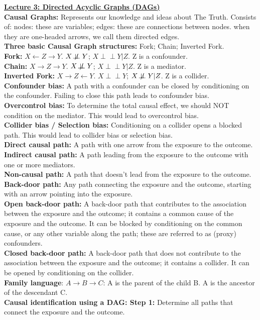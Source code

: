\documentclass[a4paper,7pt,landscape]{extarticle}
\newcommand{\indep}{\perp \!\!\! \perp} %
\newcommand{\nindep}{\not\!\perp\!\!\!\perp} %
\begin{document}
\begin{multicols}{3}
\begin{boxA}
\underline{\textbf{Lecture 3: Directed Acyclic Graphs (DAGs)}}\\
\textbf{Causal Graphs:} Represents our knowledge and ideas about The Truth. Consists of: nodes: these are variables; edges: these are connections between nodes. when they are one-headed arrows, we call them directed edges.\\
\textbf{Three basic Causal Graph structures:} Fork; Chain; Inverted Fork.\\
\textbf{Fork:} $X \leftarrow Z \rightarrow Y$. $X \nindep Y$; $X \indep Y | Z$. Z is a confounder.\\
\textbf{Chain:} $X \rightarrow Z \rightarrow Y$. $X \nindep Y$; $X \indep Y | Z$. Z is a mediator.\\
\textbf{Inverted Fork:} $X \rightarrow Z \leftarrow Y$. $X \indep Y$; $X \nindep Y | Z$. Z is a collider.\\
\textbf{Confounder bias:} A path with a confounder can be closed by conditioning on the confounder. Failing to close this path leads to confounder bias.\\
\textbf{Overcontrol bias:} To determine the total causal effect, we should NOT condition on the mediator. This would lead to overcontrol bias.\\
\textbf{Collider bias / Selection bias:} Conditioning on a collider opens a blocked path. This would lead to collider bias or selection bias.\\
\textbf{Direct causal path:} A path with one arrow from the exposure to the outcome.\\
\textbf{Indirect causal path:} A path leading from the exposure to the outcome with one or more mediators.\\
\textbf{Non-causal path:} A path that doesn't lead from the exposure to the outcome.\\
\textbf{Back-door path:} Any path connecting the exposure and the outcome, starting with an arrow pointing into the exposure.\\
\textbf{Open back-door path:} A back-door path that contributes to the association between the exposure and the outcome; it contains a common cause of the exposure and the outcome. It can be blocked by conditioning on the common cause, or any other variable along the path; these are referred to as (proxy) confounders.\\
\textbf{Closed back-door path:} A back-door path that does not contribute to the association between the exposure and the outcome; it contains a collider. It can be opened by conditioning on the collider.\\
\textbf{Family language}: $A \rightarrow B \rightarrow C$: A is the parent of the child B. A is the ancestor of the descendant C.\\
\textbf{Causal identification using a DAG: Step 1:} Determine all paths that connect the exposure and the outcome.\\
\end{boxA}


\end{multicols}
\end{document}
